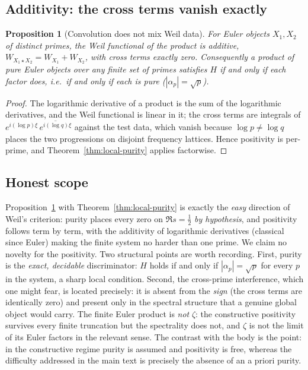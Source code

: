 \documentclass[11pt,reqno]{amsart}
\newtheorem{proposition}[theorem]{Proposition}
\theoremstyle{definition}
\newcommand{\half}{\tfrac12}
\begin{document}
\subsection{Additivity: the cross terms vanish exactly}
\begin{proposition}[Convolution does not mix Weil data]\label{prop:crosszero}
For Euler objects $X_1,X_2$ of distinct primes, the Weil functional of the product is
additive, $W_{X_1\star X_2}=W_{X_1}+W_{X_2}$, with cross terms \emph{exactly zero}.
Consequently a product of pure Euler objects over any finite set of primes satisfies
$H$ if and only if each factor does, i.e.\ if and only if each is pure
\textnormal{(}$|\alpha_p|=\sqrt p$\textnormal{)}.
\end{proposition}
\begin{proof}
The logarithmic derivative of a product is the sum of the logarithmic derivatives, and
the Weil functional is linear in it; the cross terms are integrals of
$e^{i(\log p)\xi}\,\overline{e^{i(\log q)\xi}}$ against the test data, which vanish
because $\log p\ne\log q$ places the two progressions on disjoint frequency lattices.
Hence positivity is per-prime, and Theorem~\ref{thm:local-purity} applies factorwise.
\end{proof}

\subsection{Honest scope}
Proposition~\ref{prop:crosszero} with Theorem~\ref{thm:local-purity} is exactly the
\emph{easy} direction of Weil's criterion: purity places every zero on $\Re s=\half$
\emph{by hypothesis}, and positivity follows term by term, with the additivity of
logarithmic derivatives (classical since Euler) making the finite system no harder than
one prime. We claim no novelty for the positivity. Two structural points are worth
recording. First, purity is the \emph{exact, decidable} discriminator: $H$ holds if and
only if $|\alpha_p|=\sqrt p$ for every $p$ in the system, a sharp local condition.
Second, the cross-prime interference, which one might fear, is located precisely: it is
absent from the \emph{sign} (the cross terms are identically zero) and present only in
the spectral structure that a genuine global object would carry. The finite Euler
product is \emph{not} $\zeta$: the constructive positivity survives every finite
truncation but the spectrality does not, and $\zeta$ is not the limit of its Euler
factors in the relevant sense. The contrast with the body is the point: in the
constructive regime purity is assumed and positivity is free, whereas the difficulty
addressed in the main text is precisely the absence of an a priori purity.
\end{document}
